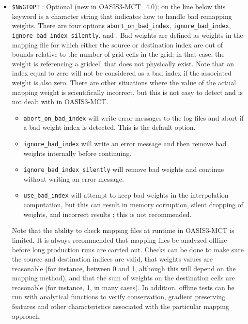 \begin{itemize}
\item {\tt \$NWGTOPT} : Optional (new in OASIS3-MCT\_4.0); on the line below this keyword is a character string
  that indicates how to handle bad remapping weights.  There are four options \newline
  {\tt abort\_on\_bad\_index}, {\tt ignore\_bad\_index}, {\tt ignore\_bad\_index\_silently}, and
 .  Bad weights are defined as weights in the mapping file for which either
  the source or destination index are out of bounds relative to the number of grid cells
  in the grid; in that case, the weight is referencing a gridcell that does not physically
  exist.  Note that an index equal to zero will not be considered as a bad index if the associated weight
  is also zero. There are other situations where the value of the actual mapping weight is
  scientifically incorrect, but this is not easy to detect and is not dealt with in OASIS3-MCT.
  \begin{itemize}
  \item {\tt abort\_on\_bad\_index} will write error messages to the log files and abort if a bad weight
  index is detected. This is the default option.
  \item {\tt ignore\_bad\_index} will write an error message and then remove bad
  weights internally before continuing.
  \item {\tt ignore\_bad\_index\_silently} will remove bad weights and continue without writing an error
  message.
  \item {\tt use\_bad\_index} will attempt to keep bad weights in the interpolation computation,
  but this can result in memory corruption, silent dropping of weights, and incorrect results ; this is not recommended.
  \end{itemize}

  Note that the ability to check mapping files at runtime in OASIS3-MCT is limited.  It is always
  recommended that mapping files be analyzed offline before long production runs are carried out.
  Checks can be done to make sure the source and destination indices are valid, that weights values
  are reasonable (for instance, between 0 and 1, although this will depend on the mapping method),
  and that the sum of weights on the destination cells are reasonable (for instance, 1, in many cases).
  In addition, offline tests can be run with analytical functions to verify conservation, gradient
  preserving features and other characteristics associated with the particular mapping approach.


\end{itemize}
